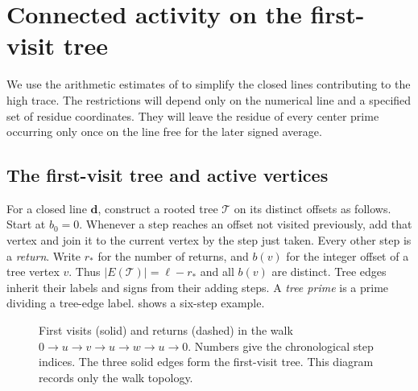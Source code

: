 \section{Connected activity on the first-visit tree}\label{sec:thinning}

We use the arithmetic estimates of  to simplify the
closed lines contributing to the high trace.  The restrictions will
depend only on the numerical line and a specified set of residue
coordinates.  They will leave the residue of every center prime
occurring only once on the line free for the later signed average.

\subsection{The first-visit tree and active vertices}

For a closed line $\boldsymbol d$, construct a rooted tree
$\mathscr T$ on its distinct offsets as follows.  Start at $b_0=0$.
Whenever a step reaches an offset not visited previously, add that
vertex and join it to the current vertex by the step just taken.
Every other step is a \emph{return}.  Write $r_*$ for the number
of returns, and $b(v)$ for the integer offset of a tree vertex $v$.
Thus $|E(\mathscr T)|=\ell-r_*$ and all $b(v)$ are distinct.
Tree edges inherit their labels and signs from their adding steps.
A \emph{tree prime} is a prime dividing a tree-edge label.
 shows a six-step example.

\begin{figure}[htbp]
\centering
{}
\caption{First visits (solid) and returns (dashed) in the walk
$0\to u\to v\to u\to w\to u\to0$.  Numbers give the chronological
step indices.  The three solid edges form the first-visit tree.
This diagram records only the walk topology.}
\label{fig:first-visit-tree}
\end{figure}

